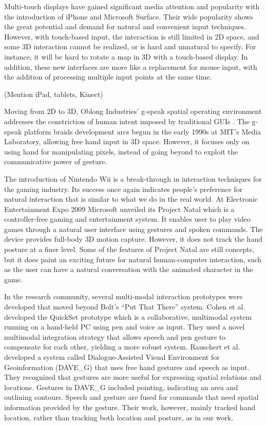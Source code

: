 Multi-touch displays have gained significant media attention and popularity with the introduction of iPhone\textsuperscript{\textregistered} and Microsoft Surface\textsuperscript{\textregistered}. Their wide popularity shows the great potential and demand for natural and convenient input techniques. However, with touch-based input, the interaction is still limited in 2D space, and some 3D interaction cannot be realized, or is hard and unnatural to specify. For instance, it will be hard to rotate a map in 3D with a touch-based display. In addition, these new interfaces are more like a replacement for mouse input, with the addition of processing multiple input points at the same time. 

(Mention iPad, tablets, Kinect)

Moving from 2D to 3D, Oblong Industries' g-speak spatial operating environment addresses the constriction of human intent imposed by traditional GUIs \cite{Oblong09}. The g-speak platform braids development arcs begun in the early 1990s at MIT's Media Laboratory, allowing free hand input in 3D space. However, it focuses only on using hand for manipulating pixels, instead of going beyond to exploit the communicative power of gesture. 

The introduction of Nintendo Wii is a break-through in interaction techniques for the gaming industry. Its success once again indicates people's preference for natural interaction that is similar to what we do in the real world. At Electronic Entertainment Expo 2009 Microsoft unveiled its Project Natal which is a controller-free gaming and entertainment system. It enables user to play video games through a natural user interface using gestures and spoken commands. The device provides full-body 3D motion capture. However, it does not track the hand posture at a finer level. Some of the features of Project Natal are still concepts, but it does paint an exciting future for natural human-computer interaction, such as the user can have a natural conversation with the animated character in the game.

In the research community, several multi-modal interaction prototypes were developed that moved beyond Bolt's ``Put That There'' system. Cohen et al. \cite{Cohen97} developed the QuickSet prototype which is a collaborative, multimodal system running on a hand-held PC using pen and voice as input. They used a novel multimodal integration strategy that allows speech and pen gesture to compensate for each other, yielding a more robust system. Rauschert et al. \cite{Rauschert02} developed a system called Dialogue-Assisted Visual Environment for Geoinformation (DAVE\_G) that uses free hand gestures and speech as input. They recognized that gestures are more useful for expressing spatial relations and locations. Gestures in DAVE\_G included pointing, indicating an area and outlining contours. Speech and gesture are fused for commands that need spatial information provided by the gesture. Their work, however, mainly tracked hand location, rather than tracking both location and posture, as in our work.

